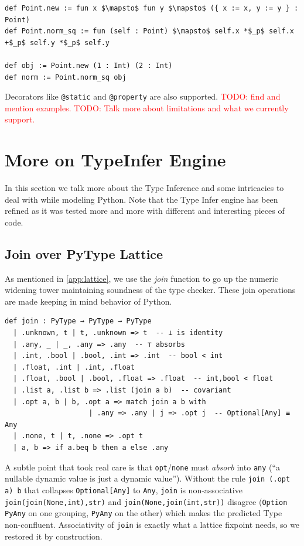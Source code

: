\documentclass{article}
\newcommand{\code}{\lstinline}
\newcommand{\todo}[1]{\textcolor{red}{TODO: #1}}
\begin{document}
{\begin{minipage}[t]{0.48\textwidth}
\begin{lstlisting}[language=lean, caption={Lean 4 translation.}, label={lst:oop-lean}, breaklines=true, mathescape=true]
def Point.new := fun x $\mapsto$ fun y $\mapsto$ ({ x := x, y := y } : Point)
def Point.norm_sq := fun (self : Point) $\mapsto$ self.x *$_p$ self.x +$_p$ self.y *$_p$ self.y

def obj := Point.new (1 : Int) (2 : Int)
def norm := Point.norm_sq obj
\end{lstlisting}
\end{minipage}

Decorators like \code{@static} and \code{@property} are also supported. \todo{find and mention examples.}
\todo{Talk more about limitations and what we currently support.}


\section{More on TypeInfer Engine}

In this section we talk more about the Type Inference and some intricacies to deal with while modeling Python. Note that the Type Infer engine has been refined as it was tested more and more with different and interesting pieces of code.

\subsection{Join over PyType Lattice}\label{join-pytype}

As mentioned in \ref{app:lattice}, we use the \emph{join} function to go up the numeric widening tower maintaining soundness of the type checker. These join operations are made keeping in mind behavior of Python.

\begin{lstlisting}[language=lean,caption={Widening join over the numeric tower (excerpt).},label={lst:join}]
def join : PyType → PyType → PyType
  | .unknown, t | t, .unknown => t  -- ⊥ is identity
  | .any, _ | _, .any => .any  -- ⊤ absorbs
  | .int, .bool | .bool, .int => .int  -- bool < int
  | .float, .int | .int, .float
  | .float, .bool | .bool, .float => .float  -- int,bool < float
  | .list a, .list b => .list (join a b)  -- covariant
  | .opt a, b | b, .opt a => match join a b with
                    | .any => .any | j => .opt j  -- Optional[Any] ≡ Any
  | .none, t | t, .none => .opt t
  | a, b => if a.beq b then a else .any
\end{lstlisting}

A subtle point that took real care is that \code{opt}/\code{none} must \emph{absorb} into \code{any}
(``a nullable dynamic value is just a dynamic value''). Without the rule
\code{join (.opt a) b} that collapses \code{Optional[Any]} to \code{Any}, \code{join} is
non-associative \code{join(join(None,int),str)} and \code{join(None,join(int,str))} disagree
(\code{Option PyAny} on one grouping, \code{PyAny} on the other) which makes the predicted Type non-confluent. Associativity of \code{join} is exactly what a lattice fixpoint needs, so we
restored it by construction.

}
\end{document}
